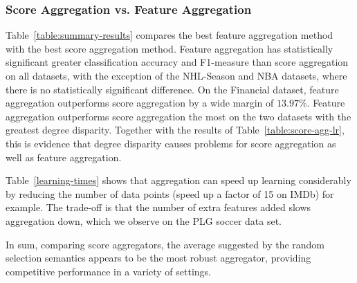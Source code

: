 \documentclass[conference]{IEEEtran}
\begin{document}
\begin{table}[ht]
\caption{Learning Time in Seconds}
\centering
{}
\label{learning-times}
\end{table}

\subsubsection{Score Aggregation vs. Feature Aggregation} Table~\ref{table:summary-results} compares the best feature aggregation method with the best score aggregation method. Feature aggregation has statistically significant greater classification accuracy and F1-measure than score aggregation on all datasets, with the exception of the NHL-Season and NBA datasets, where there is no statistically significant difference. On the Financial dataset, feature aggregation outperforms score aggregation by a wide margin of $13.97\%$.
Feature aggregation outperforms score aggregation the most on the two datasets with the greatest degree disparity. Together with the results of Table~\ref{table:score-agg-lr}, this is evidence that degree disparity causes problems for score aggregation as well as feature aggregation.

Table~\ref{learning-times} shows that aggregation can speed up learning considerably by reducing the number of data points (speed up a factor of 15 on IMDb) for example. The trade-off is that the number of extra features added slows aggregation down, which we observe on the PLG soccer data set.

In sum, comparing score aggregators, the average suggested by the random selection semantics appears to be the most robust aggregator, providing competitive performance in a variety of settings. %

\end{document}
